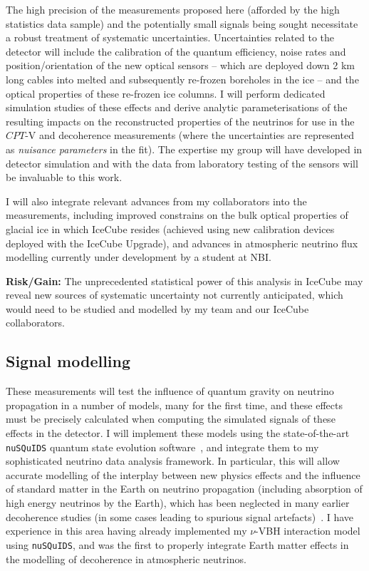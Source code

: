 \documentclass[a4paper,11pt]{article}
\begin{document}

The high precision of the measurements proposed here (afforded by the high statistics data sample) and the potentially small signals being sought necessitate a robust treatment of systematic uncertainties. Uncertainties related to the detector will include the calibration of the quantum efficiency, noise rates and position/orientation of the new optical sensors -- which are deployed down 2 km long cables into melted and subsequently re-frozen boreholes in the ice -- and the optical properties of these re-frozen ice columns. I will perform dedicated simulation studies of these effects and derive analytic parameterisations of the resulting impacts on the reconstructed properties of the neutrinos for use in the $CPT$-V and decoherence measurements (where the uncertainties are represented as \textit{nuisance parameters} in the fit). The expertise my group will have developed in detector simulation and with the data from laboratory testing of the sensors will be invaluable to this work.

I will also integrate relevant advances from my collaborators into the measurements, including improved constrains on the bulk optical properties of glacial ice in which IceCube resides (achieved using new calibration devices deployed with the IceCube Upgrade), and advances in atmospheric neutrino flux modelling currently under development by a student at NBI.

\textbf{Risk/Gain:} The unprecedented statistical power of this analysis in IceCube may reveal new sources of systematic uncertainty not currently anticipated, which would need to be studied and modelled by my team and our IceCube collaborators. \\

\subsection{Signal modelling}

These measurements will test the influence of quantum gravity on neutrino propagation in a number of models, many for the first time, and these effects must be precisely calculated when computing the simulated signals of these effects in the detector. I will implement these models using the state-of-the-art \texttt{nuSQuIDS} quantum state evolution software~\cite{Delgado:2014kpa, nusquidsGIT}, and integrate them to my sophisticated neutrino data analysis framework. In particular, this will allow accurate modelling of the interplay between new physics effects and the influence of standard matter in the Earth on neutrino propagation (including absorption of high energy neutrinos by the Earth), which has been neglected in many earlier decoherence studies (in some cases leading to spurious signal artefacts)~\cite{PhysRevD.97.115017}. I have experience in this area having already implemented my $\nu$-VBH interaction model using \texttt{nuSQuIDS}, and was the first to properly integrate Earth matter effects in the modelling of decoherence in atmospheric neutrinos.
\end{document}
